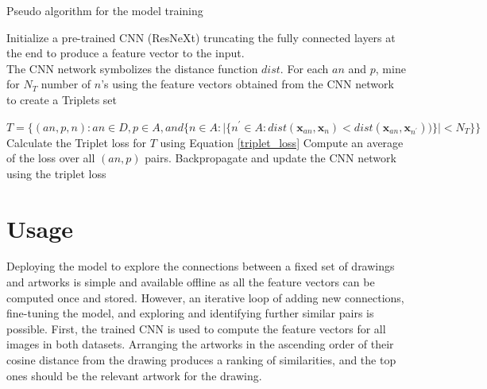\begin{algorithm}
\caption{Pseudo algorithm for the model training}\label{alg:modeltrain}
\begin{algorithmic}[1]
\State Initialize a pre-trained CNN (ResNeXt) truncating the fully connected layers at the end to produce a feature vector to the input. \\ The CNN network symbolizes the distance function \begin{math} dist \end{math}.
	\State For each \begin{math} an \end{math} and \begin{math} p \end{math}, mine for \begin{math} N_{T} \end{math} number of \begin{math} n \end{math}'s using the feature vectors obtained from the CNN network to create a Triplets set
        
    \begin{math}
    T = \{(an, p, n) : an \in D, p \in A, and \{n \in A: \lvert \{ n^{\prime} \in A : dist(\pmb{x}_{an}, \pmb{x}_{n}) < dist(\pmb{x}_{an}, \pmb{x}_{n^{\prime}})) \} \rvert < N_{T} \} \}
    \end{math}
	\State Calculate the Triplet loss for \begin{math} T \end{math} using Equation \eqref{triplet_loss}
		\State Compute an average of the loss over all \begin{math} (an, p) \end{math} pairs.
	\State Backpropagate and update the CNN network using the triplet loss
\EndWhile
\end{algorithmic}
\end{algorithm} 

\section{Usage}\label{chap:4:sec:usage}

Deploying the model to explore the connections between a fixed set of drawings and artworks is simple and available offline as all the feature vectors can be computed once and stored. However, an iterative loop of adding new connections, fine-tuning the model, and exploring and identifying further similar pairs is possible. First, the trained CNN is used to compute the feature vectors for all images in both datasets. Arranging the artworks in the ascending order of their cosine distance from the drawing produces a ranking of similarities, and the top ones should be the relevant artwork for the drawing.

